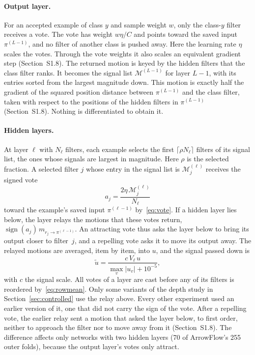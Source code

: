 \paragraph{Output layer.} For an accepted example of class $y$ and sample weight $w$, only the class-$y$ filter receives a vote. The vote has weight $w\eta/C$ and points toward the saved input $\pi^{(L-1)}$, and no filter of another class is pushed away. Here the learning rate $\eta$ scales the votes. Through the vote weights it also scales an equivalent gradient step (Section~S1.8). The returned motion is keyed by the hidden filters that the class filter ranks. It becomes the signal list $\mathcal{M}^{(L-1)}$ for layer $L-1$, with its entries sorted from the largest magnitude down. This motion is exactly half the gradient of the squared position distance between $\pi^{(L-1)}$ and the class filter, taken with respect to the positions of the hidden filters in $\pi^{(L-1)}$ (Section~S1.8). Nothing is differentiated to obtain it.

\paragraph{Hidden layers.} At layer $\ell$ with $N_\ell$ filters, each example selects the first $\lceil\rho N_\ell\rceil$ filters of its signal list, the ones whose signals are largest in magnitude. Here $\rho$ is the selected fraction. A selected filter $j$ whose entry in the signal list is $\mathcal{M}^{(\ell)}_j$ receives the signed vote
\begin{equation}
a_j=\frac{2\eta\,\mathcal{M}^{(\ell)}_j}{N_\ell}
\label{eq:hidden-vote}
\end{equation}
toward the example's saved input $\pi^{(\ell-1)}$ by~\eqref{eq:vote}. If a hidden layer lies below, the layer relays the motions that these votes return, $\operatorname{sign}(a_j)\,m_{r_j\to\pi^{(\ell-1)}}$. An attracting vote thus asks the layer below to bring its output closer to filter~$j$, and a repelling vote asks it to move its output away. The relayed motions are averaged, item by item, into $u$, and the signal passed down is
\begin{equation}
\tilde u=\frac{c\,V_\ell\,u}{\max_v|u_v|+10^{-5}},
\label{eq:signal}
\end{equation}
with $c$ the signal scale. All votes of a layer are cast before any of its filters is reordered by~\eqref{eq:rowmean}. Only some variants of the depth study in Section~\ref{sec:controlled} use the relay above. Every other experiment used an earlier version of it, one that did not carry the sign of the vote. After a repelling vote, the earlier relay sent a motion that asked the layer below, to first order, neither to approach the filter nor to move away from it (Section~S1.8). The difference affects only networks with two hidden layers (70 of ArrowFlow's 255 outer folds), because the output layer's votes only attract.

